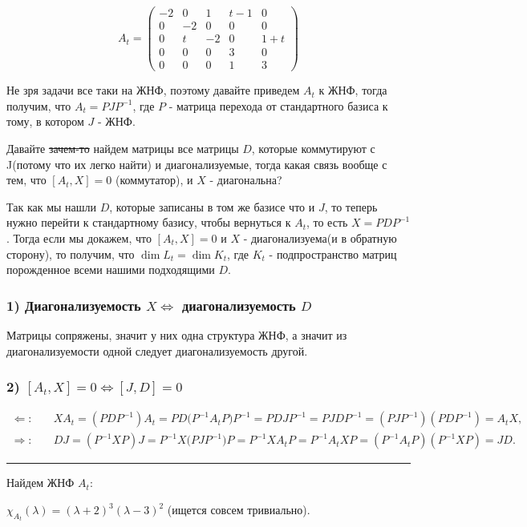 \documentclass[11pt]{article}
\begin{document}
$$
A_t =
\begin{pmatrix}
-2 & 0 & 1 & t - 1 & 0 \\
0 & -2 & 0 & 0 & 0 \\
0 & t & -2 & 0 & 1 + t \\
0 & 0 & 0 & 3 & 0 \\
0 & 0 & 0 & 1 & 3
\end{pmatrix}
$$

Не зря задачи все таки на ЖНФ, поэтому давайте приведем $A_t$ к ЖНФ, тогда получим, что $A_t = PJP^{-1}$, где $P$ - матрица перехода от стандартного базиса к тому, в котором $J$ - ЖНФ.

Давайте \st{зачем-то} найдем матрицы все матрицы $D$, которые коммутируют с J(потому что их легко найти) и диагонализуемые, тогда какая связь вообще с тем, что $[A_t, X] = 0$ (коммутатор), и $X$ - диагональна?

Так как мы нашли $D$, которые записаны в том же базисе что и $J$, то теперь нужно перейти к стандартному базису, чтобы вернуться к $A_t$, то есть $X = PDP^{-1}$. Тогда если мы докажем, что $[A_t, X] = 0$ и $X$ - диагонализуема(и в обратную сторону), то получим, что $\dim L_t = \dim K_t$, где $K_t$ - подпространство матриц порожденное всеми нашими подходящими $D$.

\subsubsection*{1) Диагонализуемость $X \iff$ диагонализуемость $D$}
Матрицы сопряжены, значит у них одна структура ЖНФ, а значит из диагонализуемости одной следует диагонализуемость другой. 

\subsubsection*{2) $[A_t, X] = 0 \iff [J, D] = 0$}

$$
\begin{align}
\Longleftarrow{:}\quad 
  &XA_t = (PDP^{-1})A_t 
    = PD\bigl(P^{-1}A_tP\bigr)P^{-1}
    = PDJP^{-1}
    = PJDP^{-1}
    = (PJP^{-1})(PDP^{-1})
    = A_tX,\\
\Longrightarrow{:}\quad 
  &DJ = (P^{-1}XP)J
    = P^{-1}X\bigl(PJP^{-1}\bigr)P
    = P^{-1}XA_tP
    = P^{-1}A_tXP
    = (P^{-1}A_tP)(P^{-1}XP)
    = JD.
\end{align}
$$

\noindent\rule{\textwidth}{0.5pt}
Найдем ЖНФ $A_t$:

$\chi_{A_t}(\lambda) = (\lambda + 2)^3(\lambda - 3)^2$ (ищется совсем тривиально).
\end{document}
